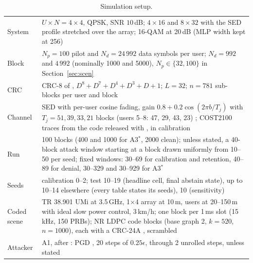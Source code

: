 \documentclass[journal]{IEEEtran}
\theoremstyle{remark}
\begin{document}
\begin{table}[t]
\centering\caption{Simulation setup.}\label{tab:setup}
\scriptsize
\begin{tabular}{@{}L{14mm}L{71mm}@{}}
\toprule
System & $U\times N=4\times4$, QPSK, SNR $10$\,dB; $4\times16$ and $8\times32$ with the SED profile stretched over the array; 16-QAM at 20\,dB (MLP width kept at 256)\\
Block & $N_p=100$ pilot and $N_d=24\,992$ data symbols per user; $N_d=992$ and $4\,992$ (nominally 1000 and 5000), $N_p\in\{32,100\}$ in Section~\ref{sec:scen}\\
CRC & CRC-8 of \cite{ts36212}, $D^8+D^7+D^4+D^3+D+1$; $L=32$; $n=781$ sub-blocks per user and block\\
Channel & SED with per-user cosine fading, gain $0.8+0.2\cos(2\pi b/T_j)$ with $T_j=51,39,33,21$ blocks (users 5--8: 47, 29, 43, 23) \cite{shlezinger2021}; COST2100 traces \cite{liu2012cost} from the code released with \cite{raviv2024}, in calibration\\
Run & 100 blocks (400 and 1000 for A3$^\ast$, 2000 clean); unless stated, a 40-block attack window starting at a block drawn uniformly from 10--50 per seed; fixed windows: 30--69 for calibration and retention, 40--89 for denial, 30--329 and 30--929 for A3$^\ast$\\
Seeds & calibration 0--2; test 10--19 (headline cell, final abstain state), up to 10--14 elsewhere (every table states its seeds), 10 (sensitivity)\\
Coded scene & TR 38.901 UMi at 3.5\,GHz, 1$\times$4 array at 10\,m, users at 20--150\,m with ideal slow power control, 3\,km/h; one block per 1\,ms slot (15\,kHz, 150 PRBs); NR LDPC code blocks (base graph 2, $k=520$, $n=1000$), each with a CRC-24A \cite{ts38212}, scrambled \cite{ts38211}\\
Attacker & A1, after \cite{wu2024}: PGD \cite{madry2018}, 20 steps of $0.25\epsilon$, through 2 unrolled steps, unless stated\\
\bottomrule
\end{tabular}
\end{table}
\end{document}
